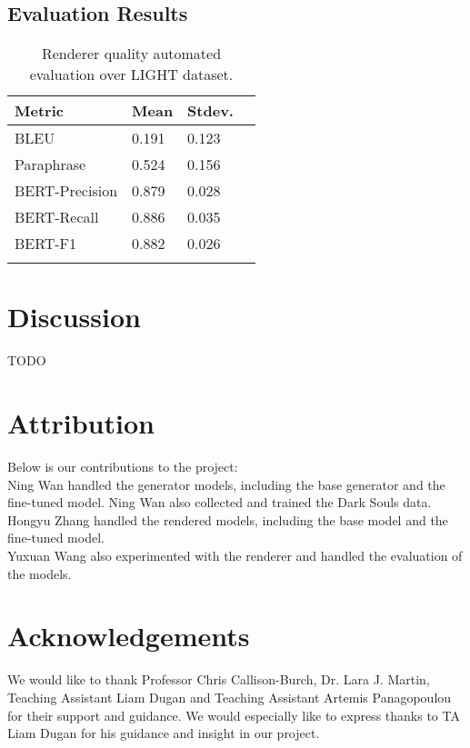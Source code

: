 \documentclass[11pt]{article}
\begin{document}
\subsection{Evaluation Results}
\begin{table}[ht]
\centering
\small
\begin{tabular}{llll}
    \caption{Renderer quality automated evaluation over LIGHT dataset.}
    \toprule
    Metric          & Mean  & Stdev.\\
    \midrule 
    BLEU            & 0.191 & 0.123 \\
    Paraphrase      & 0.524 & 0.156 \\
    BERT-Precision  & 0.879 & 0.028 \\
    BERT-Recall     & 0.886 & 0.035 \\
    BERT-F1         & 0.882 & 0.026 \\
    \bottomrule\\
    \end{tabular}
    \label{tab:render-light-eval}
\end{table}


\section{Discussion}
TODO
\section{Attribution}
Below is our contributions to the project:\\
Ning Wan handled the generator models, including the base generator and the fine-tuned model. Ning Wan also collected and trained the Dark Souls data.\\
Hongyu Zhang handled the rendered models, including the base model and the fine-tuned model. \\
Yuxuan Wang also experimented with the renderer and handled the evaluation of the models.\\

\section*{Acknowledgements}
We would like to thank Professor Chris Callison-Burch, Dr. Lara J. Martin, Teaching Assistant Liam Dugan and Teaching Assistant Artemis Panagopoulou for their support and guidance. We would especially like to express thanks to TA Liam Dugan for his guidance and insight in our project.

\newpage



\end{document}
